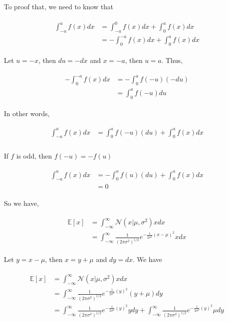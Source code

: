 To proof that, we need to know that

\begin{align}
    \begin{split}
        \int_{-a}^{a} f(x)dx & = \int_{-a}^{0} f(x)dx + \int_{0}^{a} f(x)dx\\
        & = - \int_{0}^{-a} f(x)dx + \int_{0}^{a} f(x)dx
    \end{split}
\end{align}

Let $u = -x$, then $du = -dx$ and $x = -a$, then $u = a$. Thus,

\begin{align}
    \begin{split}
        - \int_{0}^{-a} f(x)dx & = - \int_{0}^{a}  f(-u)(-du)\\
        & = \int_{0}^{a} f(-u)du
    \end{split}
\end{align}

In other words,

\begin{align}
    \begin{split}
        \int_{-a}^{a} f(x)dx & = \int_{0}^{a}  f(-u)(du) + \int_{0}^{a} f(x)dx\\
    \end{split}
\end{align}

If $f$ is odd, then $f(-u) = -f(u)$

\begin{align}
    \begin{split}
        \int_{-a}^{a} f(x)dx & = -\int_{0}^{a}  f(u)(du) + \int_{0}^{a} f(x)dx\\
        & = 0
    \end{split}
\end{align}

So we have,

\begin{align}
    \begin{split}
        \mathbb{E}[x] & = \int_{- \infty}^{\infty} \mathcal{N}(x | \mu, \sigma^2)xdx\\
        & = \int_{- \infty}^{\infty} \frac{1}{(2\pi \sigma ^2)^{1/2}} e^{-\frac{1}{2\sigma^2}(x - \mu)^2}xdx
    \end{split}
\end{align}

Let $y = x - \mu$,  then $x = y + \mu$ and $dy = dx$. We have

\begin{align}
    \begin{split}
        \mathbb{E}[x] & = \int_{- \infty}^{\infty} \mathcal{N}(x | \mu, \sigma^2)xdx\\
        & = \int_{- \infty}^{\infty} \frac{1}{(2\pi \sigma ^2)^{1/2}} e^{-\frac{1}{2\sigma^2}(y)^2}(y + \mu)dy\\
        & = \int_{- \infty}^{\infty} \frac{1}{(2\pi \sigma ^2)^{1/2}} e^{-\frac{1}{2\sigma^2}(y)^2}ydy + \int_{- \infty}^{\infty} \frac{1}{(2\pi \sigma ^2)^{1/2}} e^{-\frac{1}{2\sigma^2}(y)^2}\mu dy\\
    \end{split}
\end{align}

